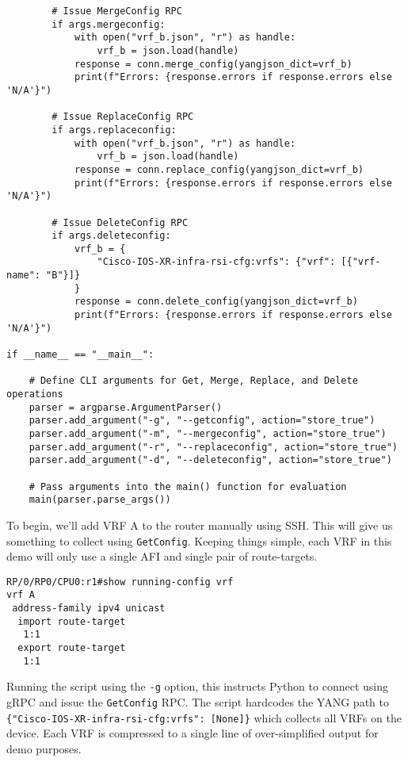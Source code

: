 \begin{verbatim}
        # Issue MergeConfig RPC
        if args.mergeconfig:
            with open("vrf_b.json", "r") as handle:
                vrf_b = json.load(handle)
            response = conn.merge_config(yangjson_dict=vrf_b)
            print(f"Errors: {response.errors if response.errors else 'N/A'}")

        # Issue ReplaceConfig RPC
        if args.replaceconfig:
            with open("vrf_b.json", "r") as handle:
                vrf_b = json.load(handle)
            response = conn.replace_config(yangjson_dict=vrf_b)
            print(f"Errors: {response.errors if response.errors else 'N/A'}")

        # Issue DeleteConfig RPC
        if args.deleteconfig:
            vrf_b = {
                "Cisco-IOS-XR-infra-rsi-cfg:vrfs": {"vrf": [{"vrf-name": "B"}]}
            }
            response = conn.delete_config(yangjson_dict=vrf_b)
            print(f"Errors: {response.errors if response.errors else 'N/A'}")

if __name__ == "__main__":

    # Define CLI arguments for Get, Merge, Replace, and Delete operations
    parser = argparse.ArgumentParser()
    parser.add_argument("-g", "--getconfig", action="store_true")
    parser.add_argument("-m", "--mergeconfig", action="store_true")
    parser.add_argument("-r", "--replaceconfig", action="store_true")
    parser.add_argument("-d", "--deleteconfig", action="store_true")

    # Pass arguments into the main() function for evaluation
    main(parser.parse_args())
\end{verbatim}

To begin, we'll add VRF A to the router manually using SSH\@. This will
give us something to collect using \verb|GetConfig|. Keeping things
simple, each VRF in this demo will only use a single AFI and single
pair of route-targets.

\begin{verbatim}
RP/0/RP0/CPU0:r1#show running-config vrf
vrf A
 address-family ipv4 unicast
  import route-target
   1:1
  export route-target
   1:1
\end{verbatim}

Running the script using the \verb|-g| option, this instructs Python
to connect using gRPC and issue the \verb|GetConfig| RPC\@. The script
hardcodes the YANG path to \verb|{"Cisco-IOS-XR-infra-rsi-cfg:vrfs": [None]}|
which collects all VRFs on the device. Each VRF is compressed to a single
line of over-simplified output for demo purposes.

